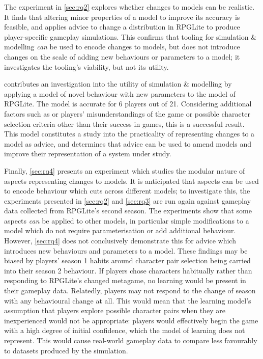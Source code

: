 The experiment in \cref{sec:rq2} explores whether \aspectoriented{} changes to
models can be realistic. It finds that altering minor properties of a model to
improve its accuracy is feasible, and applies advice to change a distribution in
RPGLite to produce player-specific gameplay simulations. This confirms that
\aspectoriented{} tooling for simulation \& modelling \emph{can} be used to
encode changes to models, but does not introduce changes on the scale of adding
new behaviours or parameters to a model; it investigates the tooling's
viability, but not its utility.

 contributes an investigation into the utility of
\aspectoriented{} simulation \& modelling by applying a model of novel behaviour
with new parameters to the model of RPGLite. The model is accurate for 6 players
out of 21. Considering additional factors such as or players' misunderstandings
of the game or possible character selection criteria other than their success in
games, this is a successful result. This model constitutes a study into the
practicality of representing changes to a model as advice, and determines that
advice can be used to amend models and improve their representation of a system
under study.

Finally, \cref{sec:rq4} presents an experiment which studies the modular nature
of aspects representing changes to models. It is anticipated that aspects can be
used to encode behaviour which cuts across different models; to investigate
this, the experiments presented in \cref{sec:rq2} and \cref{sec:rq3} are run
again against gameplay data collected from RPGLite's second season. The
experiments show that some aspects \emph{can} be applied to other models, in
particular simple modifications to a model which do not require parameterisation
or add additional behaviour. However, \cref{sec:rq4} does not conclusively
demonstrate this for advice which introduces new behaviours and parameters to a
model. These findings may be biased by players' season 1 habits around character
pair selection being carried into their season 2 behaviour. If players chose
characters habitually rather than responding to RPGLite's changed metagame, no
learning would be present in their gameplay data. Relatedly, players may not
respond to the change of season with any behavioural change at all. This would
mean that the learning model's assumption that players explore possible
character pairs when they are inexperienced would not be appropriate: players
would effectively begin the game with a high degree of initial confidence, which
the model of learning does not represent. This would cause real-world gameplay
data to compare less favourably to datasets produced by the simulation.

